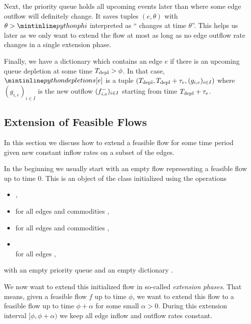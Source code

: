 Next, the priority queue  holds all upcoming events later than  where some edge outflow will definitely change.
It saves tuples $(e, \theta)$ with $\theta > \code{phi}$ interpreted as `` changes at time $\theta$''.
This helps us later as we only want to extend the flow at most as long as no edge outflow rate changes in a single extension phase.

Finally, we have a dictionary  which contains an edge $e$ if there is an upcoming queue depletion at some time $T_{\textnormal{depl}} > \phi$.
In that case, $\code{depletions[e]}$ is a tuple $(T_{\textnormal{depl}}, T_{\textnormal{depl}}+ \tau_e, (g_{i,e})_{i\in I})$ where $(g_{i,e})_{i\in I}$ is the new outflow $({f}^-_{i,e})_{i\in I}$ starting from time $T_{\textnormal{depl}} + \tau_e$.


\subsection{Extension of Feasible Flows}

In this section we discuss how to extend a feasible flow for some time period given new constant inflow rates on a subset of the edges.

In the beginning we usually start with an empty flow representing a feasible flow up to time $0$.
This is an object of the class  initialized using the operations
\begin{itemize}[left=0pt]
  \setlength{\itemsep}{0em}
\item {},
\item {} for all edges  and commodities ,
\item {} for all edges  and commodities ,
\item {}\\ for all edges ,
\end{itemize}
with an empty priority queue  and an empty dictionary .

We now want to extend this initialized flow in so-called \emph{extension phases}.
That means, given a feasible flow $f$ up to time $\phi$, we want to extend this flow to a feasible flow up to time $\phi + \alpha$ for some small $\alpha > 0$.
During this extension interval $[\phi, \phi+\alpha)$ we keep all edge inflow and outflow rates constant.

